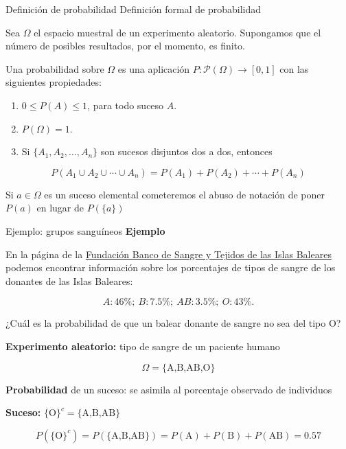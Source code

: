\documentclass[
  ignorenonframetext,
]{beamer}
\providecommand{\tightlist}{%
  \setlength{\itemsep}{0pt}\setlength{\parskip}{0pt}}
\begin{document}
\begin{frame}{Definición de probabilidad}
\protect\hypertarget{definiciuxf3n-de-probabilidad-1}{}
Definición formal de probabilidad

Sea \(\Omega\) el espacio muestral de un experimento aleatorio.
Supongamos que el número de posibles resultados, por el momento, es
finito.

Una probabilidad sobre \(\Omega\) es una aplicación
\(P:\mathcal{P}(\Omega)\to [0,1]\) con las siguientes propiedades:

\begin{enumerate}
\tightlist
\item
  \(0\leq P(A)\leq 1\), para todo suceso \(A\).
\item
  \(P(\Omega)=1\).
\item
  Si \(\{A_1,A_2,\ldots,A_n\}\) son sucesos disjuntos dos a dos,
  entonces
\end{enumerate}

\[
P(A_1\cup A_2\cup \cdots \cup A_n)=P(A_1)+P(A_2)+\cdots +P(A_n)
\]

Si \(a\in \Omega\) es un suceso elemental cometeremos el abuso de
notación de poner \(P(a)\) en lugar de \(P(\{a\})\)
\end{frame}

\begin{frame}{Ejemplo: grupos sanguíneos}
\protect\hypertarget{ejemplo-grupos-sanguuxedneos}{}
\textbf{Ejemplo}

En la página de la
\href{http://www.donasang.org/que-es-la-sang/es_frequencies-dels-diferents-grups.html}{Fundación
Banco de Sangre y Tejidos de las Islas Baleares} podemos encontrar
información sobre los porcentajes de tipos de sangre de los donantes de
las Islas Baleares:

\[A: 46\%;\  B: 7.5\%;\  AB: 3.5\%;\  O: 43\%.\]

¿Cuál es la probabilidad de que un balear donante de sangre no sea del
tipo O?

\textbf{Experimento aleatorio:} tipo de sangre de un paciente humano

\[\Omega=\{\mbox{A,B,AB,O}\}\]

\textbf{Probabilidad} de un suceso: se asimila al porcentaje observado
de individuos

\textbf{Suceso:} \(\{\mbox{O}\}^c=\{\mbox{A,B,AB}\}\)

\[P(\{\mbox{O}\}^c)\!=\!P(\{\mbox{A,B,AB}\})\!=\!
P(\mbox{A})+P (\mbox{B})+P(\mbox{AB})\!=\!0.57\]
\end{frame}
\end{document}
